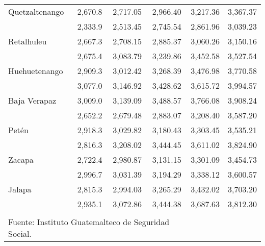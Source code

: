 \begin{center}
\begin{spacing}{1.2}
\begin{tabular}{p{2.5cm}ccccc}
			\multicolumn{1}{l}{	Quetzaltenango	}&	 2,670.8 	 & 	2,717.05	 & 	2,966.40	 & 	3,217.36	 & 	 3,367.37 	 \\ 
			\rowcolor{color1!5!white}\multicolumn{1}{l}{	Suchitepéquez	}&	 2,333.9 	 & 	2,513.45	 & 	2,745.54	 & 	2,861.96	 & 	 3,039.23 	 \\ 
			\multicolumn{1}{l}{	Retalhuleu	}&	 2,667.3 	 & 	2,708.15	 & 	2,885.37	 & 	3,060.26	 & 	 3,150.16 	 \\ 
			\rowcolor{color1!5!white}\multicolumn{1}{l}{	San Marcos	}&	 2,675.4 	 & 	3,083.79	 & 	3,239.86	 & 	3,452.58	 & 	 3,527.54 	 \\ 
			\multicolumn{1}{l}{	Huehuetenango	}&	 2,909.3 	 & 	3,012.42	 & 	3,268.39	 & 	3,476.98	 & 	 3,770.58 	 \\ 
			\rowcolor{color1!5!white}\multicolumn{1}{l}{	Quiché	}&	 3,077.0 	 & 	3,146.92	 & 	3,428.62	 & 	3,615.72	 & 	 3,994.57 	 \\ 
			\multicolumn{1}{l}{	Baja Verapaz	}&	 3,009.0 	 & 	3,139.09	 & 	3,488.57	 & 	3,766.08	 & 	 3,908.24 	 \\ 
			\rowcolor{color1!5!white}\multicolumn{1}{l}{	Alta Verapaz	}&	 2,652.2 	 & 	2,679.48	 & 	2,883.07	 & 	3,208.40	 & 	 3,587.20 	 \\ 
			\multicolumn{1}{l}{	Petén	}&	 2,918.3 	 & 	3,029.82	 & 	3,180.43	 & 	3,303.45	 & 	 3,535.21 	 \\ 
			\rowcolor{color1!5!white}\multicolumn{1}{l}{	Izabal	}&	 2,816.3 	 & 	3,208.02	 & 	3,444.45	 & 	3,611.02	 & 	 3,824.90 	 \\ 
			\multicolumn{1}{l}{	Zacapa	}&	 2,722.4 	 & 	2,980.87	 & 	3,131.15	 & 	3,301.09	 & 	 3,454.73 	 \\ 
			\rowcolor{color1!5!white}\multicolumn{1}{l}{	Chiquimula	}&	 2,996.7 	 & 	3,031.39	 & 	3,194.29	 & 	3,338.12	 & 	 3,600.57 	 \\ 
			\multicolumn{1}{l}{	Jalapa	}&	 2,815.3 	 & 	2,994.03	 & 	3,265.29	 & 	3,432.02	 & 	 3,703.20 	 \\ 
			\rowcolor{color1!5!white}\multicolumn{1}{l}{	Jutiapa	}&	 2,935.1 	 & 	3,072.86	 & 	3,444.38	 & 	3,687.63	 & 	 3,812.30 	 \\ 
			\hline
			&&&\\[-0.36cm]
			\multicolumn{4}{l}{\footnotesize Fuente: Instituto Guatemalteco de Seguridad Social.}\\
		\end{tabular}\addtocounter{Cuadro}{1}
	\end{spacing}
\end{center}

